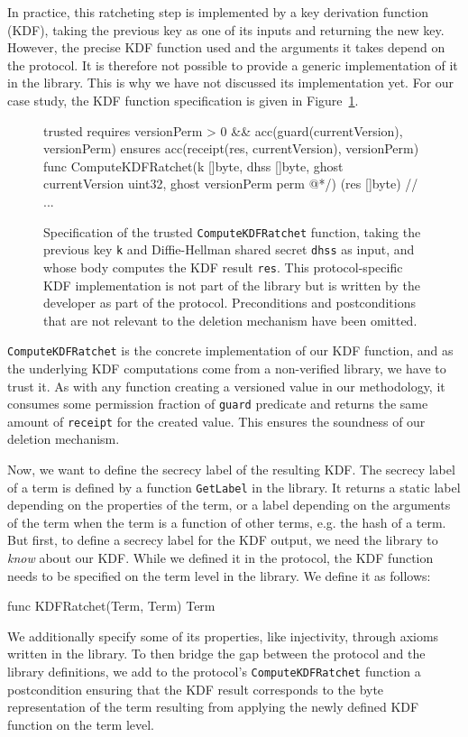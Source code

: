 In practice, this ratcheting step is implemented by a key derivation function (KDF), taking the previous key as one of its inputs and returning the new key.
However, the precise KDF function used and the arguments it takes depend on the protocol. It is therefore not possible to provide a generic implementation of it in the library. This is why we have not discussed its implementation yet.
For our case study, the KDF function specification is given in Figure~\ref{lst:kdf-ratchet}.

\begin{figure}
    \begin{gobra}
trusted
requires versionPerm > 0 && acc(guard(currentVersion), versionPerm)
ensures  acc(receipt(res, currentVersion), versionPerm)
func ComputeKDFRatchet(k []byte, dhss []byte, ghost currentVersion
    uint32, ghost versionPerm perm @*/) (res []byte) {
    // ...
}
    \end{gobra}
    \caption{Specification of the trusted \texttt{ComputeKDFRatchet} function, taking the previous key \texttt{k} and Diffie-Hellman shared secret \texttt{dhss} as input, and whose body computes the KDF result \texttt{res}. This protocol-specific KDF implementation is not part of the library but is written by the developer as part of the protocol. Preconditions and postconditions that are not relevant to the deletion mechanism have been omitted.}
    \label{lst:kdf-ratchet}
\end{figure}

\texttt{ComputeKDFRatchet} is the concrete implementation of our KDF function, and as the underlying KDF computations come from a non-verified library, we have to trust it.
As with any function creating a versioned value in our methodology, it consumes some permission fraction of \texttt{guard} predicate and returns the same amount of \texttt{receipt} for the created value. This ensures the soundness of our deletion mechanism.

Now, we want to define the secrecy label of the resulting KDF.
The secrecy label of a term is defined by a function \texttt{GetLabel} in the library. It returns a static label depending on the properties of the term, or a label depending on the arguments of the term when the term is a function of other terms, e.g. the hash of a term.
But first, to define a secrecy label for the KDF output, we need the library to \emph{know} about our KDF. While we defined it in the protocol, the KDF function needs to be specified on the term level in the library. We define it as follows:
\begin{gobra}
func KDFRatchet(Term, Term) Term
\end{gobra}
We additionally specify some of its properties, like injectivity, through axioms written in the library.
To then bridge the gap between the protocol and the library definitions, we add to the protocol's \texttt{ComputeKDFRatchet} function a postcondition ensuring that the KDF result corresponds to the byte representation of the term resulting from applying the newly defined KDF function on the term level.

